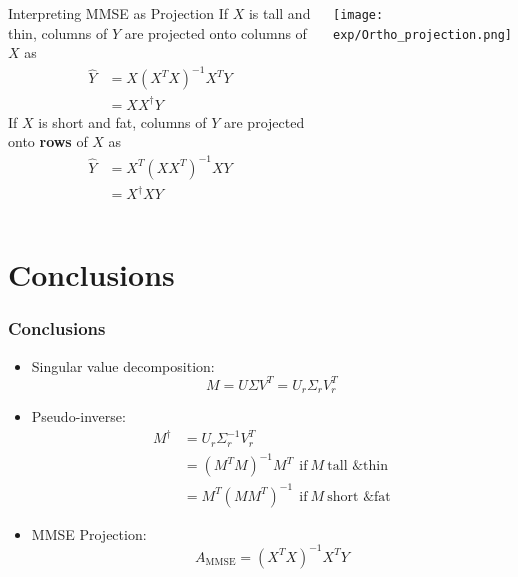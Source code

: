 \documentclass{beamer}
\begin{document}
\begin{frame}
  \begin{columns}[t]
    \column{2.5in}
    \begin{block}{Interpreting MMSE as Projection}
      If $X$ is tall and thin, columns of $Y$ are projected onto
      columns of $X$ as
      \begin{align*}
        \hat{Y}&=X(X^TX)^{-1}X^TY\\
        &=XX^\dag Y
      \end{align*}
      If $X$ is short and fat, columns of $Y$ are projected onto
      {\bf rows} of $X$ as
      \begin{align*}
        \hat{Y}&=X^T(XX^T)^{-1}XY\\
        &=X^\dag XY
      \end{align*}
    \end{block}
    \column{2.25in}
    \begin{block}{}
      \centerline{\texttt{[image: exp/Ortho\_projection.png]}}
    \end{block}
  \end{columns}
\end{frame}

    
\section{Conclusions}
\setcounter{subsection}{1}
\begin{frame}
  \frametitle{Conclusions}
  \begin{itemize}
  \item Singular value decomposition:
    \begin{displaymath}
      M = U\Sigma V^T = U_r\Sigma_rV_r^T
    \end{displaymath}
  \item Pseudo-inverse:
    \begin{align*}
      M^\dag &= U_r\Sigma_r^{-1}V_r^T\\
      &= (M^TM)^{-1}M^T~~\text{if}~M~\text{tall \& thin}\\
      &= M^T(MM^T)^{-1}~~\text{if}~M~\text{short \& fat}
    \end{align*}
  \item MMSE Projection:
    \begin{displaymath}
      A_{\text{MMSE}}=(X^TX)^{-1}X^TY
    \end{displaymath}
  \end{itemize}
\end{frame}
\end{document}
